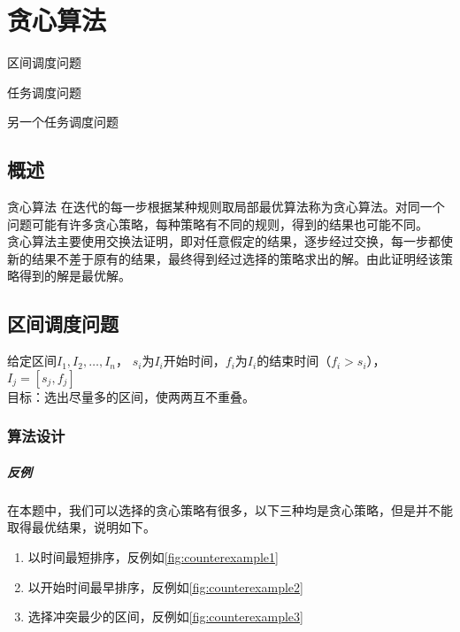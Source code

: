 \chapter{贪心算法}

\begin{introduction}
	\item 区间调度问题
	\item 任务调度问题
	\item 另一个任务调度问题
\end{introduction}


\section{概述}
\begin{definition}{贪心算法}
    在迭代的每一步根据某种规则取局部最优算法称为贪心算法。对同一个问题可能有许多贪心策略，每种策略有不同的规则，得到的结果也可能不同。
    \\贪心算法主要使用交换法证明，即对任意假定的结果，逐步经过交换，每一步都使新的结果不差于原有的结果，最终得到经过选择的策略求出的解。由此证明经该策略得到的解是最优解。
\end{definition}



\section{区间调度问题}
\begin{example}
    给定区间$I_1, I_2, \ldots, I_n$，
	$s_i$为$I_i$开始时间，$f_i$为$I_i$的结束时间（$f_i>s_i$），$I_j=[s_j,f_j]$
	\\目标：选出尽量多的区间，使两两互不重叠。
\end{example}

\subsection{算法设计}


\paragraph*{反例}
在本题中，我们可以选择的贪心策略有很多，以下三种均是贪心策略，但是并不能取得最优结果，说明如下。

\begin{enumerate}
	\item 以时间最短排序，反例如\autoref{fig:counterexample1}
	\item 以开始时间最早排序，反例如\autoref{fig:counterexample2}
	\item 选择冲突最少的区间，反例如\autoref{fig:counterexample3}
\end{enumerate}

